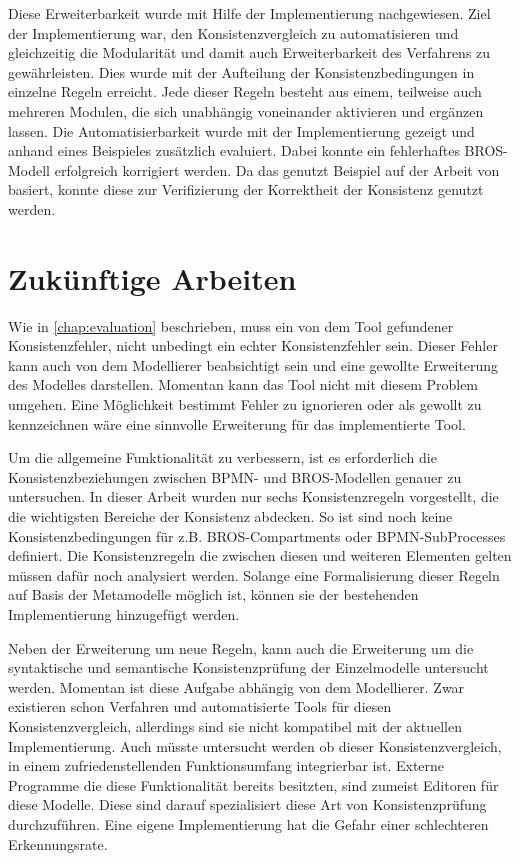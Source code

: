 Diese Erweiterbarkeit wurde mit Hilfe der Implementierung nachgewiesen.
Ziel der Implementierung war, den Konsistenzvergleich zu automatisieren und gleichzeitig die Modularität und damit auch Erweiterbarkeit des Verfahrens zu gewährleisten.
Dies wurde mit der Aufteilung der Konsistenzbedingungen in einzelne Regeln erreicht.
Jede dieser Regeln besteht aus einem, teilweise auch mehreren Modulen, die sich unabhängig voneinander aktivieren und ergänzen lassen.
Die Automatisierbarkeit wurde mit der Implementierung gezeigt und anhand eines Beispieles zusätzlich evaluiert.
Dabei konnte ein fehlerhaftes BROS-Modell erfolgreich korrigiert werden.
Da das genutzt Beispiel auf der Arbeit von \cite{Schoen} basiert, konnte diese zur Verifizierung der Korrektheit der Konsistenz genutzt werden.

\section{Zukünftige Arbeiten}

Wie in \cref{chap:evaluation} beschrieben, muss ein von dem Tool gefundener Konsistenzfehler, nicht unbedingt ein echter Konsistenzfehler sein.
Dieser Fehler kann auch von dem Modellierer beabsichtigt sein und eine gewollte Erweiterung des Modelles darstellen.
Momentan kann das Tool nicht mit diesem Problem umgehen.
Eine Möglichkeit bestimmt Fehler zu ignorieren oder als gewollt zu kennzeichnen wäre eine sinnvolle Erweiterung für das implementierte Tool.

Um die allgemeine Funktionalität zu verbessern, ist es erforderlich die Konsistenzbeziehungen zwischen BPMN- und BROS-Modellen genauer zu untersuchen.
In dieser Arbeit wurden nur sechs Konsistenzregeln vorgestellt, die die wichtigsten Bereiche der Konsistenz abdecken.
So ist sind noch keine Konsistenzbedingungen für z.B. BROS-Compartments oder BPMN-SubProcesses definiert.
Die Konsistenzregeln die zwischen diesen und weiteren Elementen gelten müssen dafür noch analysiert werden.
Solange eine Formalisierung dieser Regeln auf Basis der Metamodelle möglich ist, können sie der bestehenden Implementierung hinzugefügt werden.

Neben der Erweiterung um neue Regeln, kann auch die Erweiterung um die syntaktische und semantische Konsistenzprüfung der Einzelmodelle untersucht werden.
Momentan ist diese Aufgabe abhängig von dem Modellierer.
Zwar existieren schon Verfahren und automatisierte Tools für diesen Konsistenzvergleich, allerdings sind sie nicht kompatibel mit der aktuellen Implementierung.
Auch müsste untersucht werden ob dieser Konsistenzvergleich, in einem zufriedenstellenden Funktionsumfang integrierbar ist.
Externe Programme die diese Funktionalität bereits besitzten, sind zumeist Editoren für diese Modelle.
Diese sind darauf spezialisiert diese Art von Konsistenzprüfung durchzuführen.
Eine eigene Implementierung hat die Gefahr einer schlechteren Erkennungsrate.

